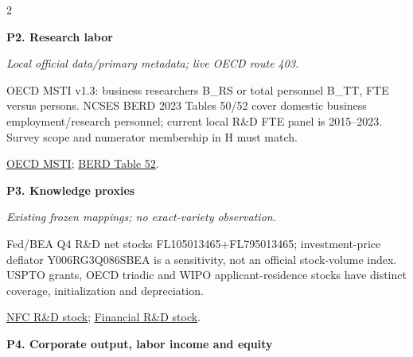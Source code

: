 \documentclass[10pt,a4paper,landscape]{article}
\begin{document}
\begin{multicols}{2}
\noindent\begin{minipage}{\linewidth}\raggedright

\hypertarget{src-P2}{\textbf{P2. Research labor}}\par

{\footnotesize\itshape Local official data/primary metadata; live OECD route 403.}\par

OECD MSTI v1.3: business researchers B\_RS or total personnel B\_TT, FTE versus persons. NCSES BERD 2023 Tables 50/52 cover domestic business employment/research personnel; current local R\&D FTE panel is 2015--2023. Survey scope and numerator membership in H must match.

\par \href{https://www.oecd.org/en/data/datasets/main-science-and-technology-indicators.html}{OECD MSTI}; \href{https://ncses.nsf.gov/pubs/nsf25354/assets/data-tables/tables/nsf25354-tab052.pdf}{BERD Table 52}.

\end{minipage}\par\vspace{6pt}

\noindent\begin{minipage}{\linewidth}\raggedright

\hypertarget{src-P3}{\textbf{P3. Knowledge proxies}}\par

{\footnotesize\itshape Existing frozen mappings; no exact-variety observation.}\par

Fed/BEA Q4 R\&D net stocks FL105013465+FL795013465; investment-price deflator Y006RG3Q086SBEA is a sensitivity, not an official stock-volume index. USPTO grants, OECD triadic and WIPO applicant-residence stocks have distinct coverage, initialization and depreciation.

\par \href{https://fred.stlouisfed.org/series/BOGZ1FL105013465Q}{NFC R\&D stock}; \href{https://fred.stlouisfed.org/series/BOGZ1FL795013465Q}{Financial R\&D stock}.

\end{minipage}\par\vspace{6pt}

\noindent\begin{minipage}{\linewidth}\raggedright

\hypertarget{src-P4}{\textbf{P4. Corporate output, labor income and equity}}\par


\end{minipage}
\end{multicols}
\end{document}
